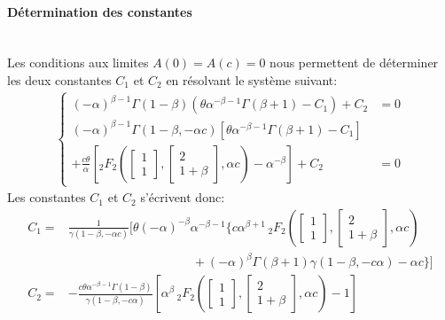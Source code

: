 \paragraph{Détermination des constantes}\phantom{}\\
Les conditions aux limites $A(0)=A(c)=0$ nous permettent de déterminer les deux constantes $C_1$ et $C_2$ en résolvant le système suivant: 
\begin{align*}
\left\{\begin{aligned}
    {(-\alpha)}^{\beta-1}\Gamma(1-\beta)(\theta\alpha^{-\beta-1}\Gamma(\beta+1)-C_1)+C_2 &= 0 \\
    {(-\alpha)}^{\beta-1}\Gamma(1-\beta,-\alpha c)[\theta\alpha^{-\beta-1}\Gamma(\beta+1)-C_1]\\+ \frac{c\theta}{\alpha}\left[{}_2F_2\left(\begin{bmatrix}1\\1\end{bmatrix},\begin{bmatrix}2\\1+\beta\end{bmatrix},\alpha c\right)-\alpha^{-\beta}\right] +C_2 &=0
\end{aligned}\right.
\end{align*}
Les constantes $C_1$ et $C_2$ s'écrivent donc: 
\begin{equation}\label{area_constants}
    \begin{aligned}
        C_1 =& \frac{1}{\gamma (1-\beta ,-\alpha c)}\Bigg[\theta  {(-\alpha)}^{-\beta } \alpha ^{-\beta -1} \Bigg\{c \alpha ^{\beta +1} \,{}_2F_2\left(\begin{bmatrix}1\\1\end{bmatrix},\begin{bmatrix}2\\1+\beta\end{bmatrix},\alpha c\right)\\&\quad\quad\quad\quad\quad\quad\quad\quad\quad\quad+
        {(-\alpha)}^{\beta } \Gamma(\beta +1)\gamma (1-\beta ,-c \alpha )-\alpha  c\Bigg\}\Bigg] \\
        C_2 =& -\frac{c \theta  \alpha ^{-\beta -1} \Gamma (1-\beta ) }{\gamma(1-\beta ,-c \alpha )}\left[\alpha ^{\beta } \,{}_2F_2\left(\begin{bmatrix}1\\1\end{bmatrix},\begin{bmatrix}2\\1+\beta\end{bmatrix},\alpha c\right)-1\right]
    \end{aligned}
\end{equation}

